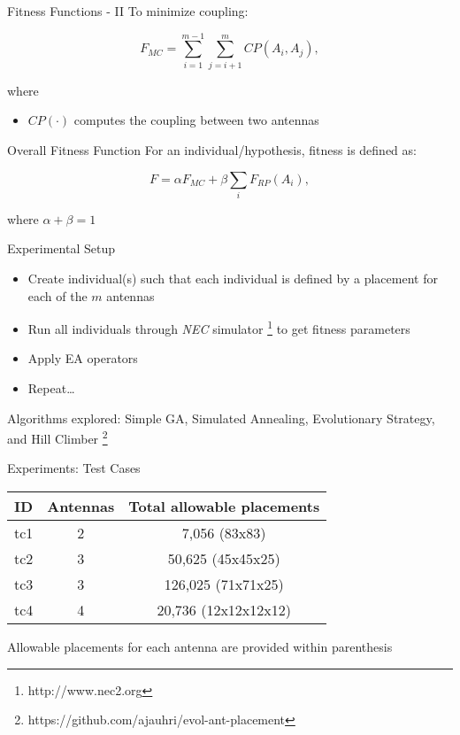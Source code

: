 \documentclass{beamer}
\begin{document}
\begin{frame}{Fitness Functions - II}
    To minimize coupling: 
\begin{tcolorbox}[colback=green!5]
\begin{equation}
  F_{MC} = \sum_{i=1}^{m-1}\sum_{j=i+1}^{m} CP(A_i, A_j),
\end{equation}
\end{tcolorbox}
where
\begin{itemize}
    \item $CP(\cdot)$ computes the coupling between two antennas
\end{itemize}
\end{frame}

\begin{frame}{Overall Fitness Function}
For an individual/hypothesis, fitness is defined as:
\begin{tcolorbox}[colback=green!5]
\begin{equation} \label{eq:optimal}
  F = \alpha F_{MC} + \beta \sum_{i} F_{RP}(A_i),
\end{equation}
\end{tcolorbox}
where $\alpha + \beta = 1$
\end{frame}

\begin{frame}[t]{Experimental Setup}
    \begin{itemize}
        \item Create individual(s) such that each individual is defined by a placement for each of the $m$ antennas
        \item Run all individuals through \textit{NEC} simulator \footnote{http://www.nec2.org} to get fitness parameters 
        \item Apply EA operators 
        \item Repeat\dots 
    \end{itemize}
    \vspace{10mm}
    Algorithms explored: Simple GA, Simulated Annealing, Evolutionary Strategy, and Hill Climber \footnote{https://github.com/ajauhri/evol-ant-placement} 
\end{frame}
\begin{frame}{Experiments: Test Cases}
\begin{table}
\centering
\begin{tabular}{|c|c|c|} \hline
    ID&Antennas&Total allowable placements\\ \hline
tc1 & 2 & 7,056 (83x83) \\ \hline
tc2 & 3 & 50,625 (45x45x25) \\ \hline
tc3 & 3 & 126,025 (71x71x25) \\ \hline
tc4 & 4 & 20,736 (12x12x12x12) \\
\hline\end{tabular}
\end{table}
\small *Allowable placements for each antenna are provided within parenthesis
\end{frame}
\end{document}
